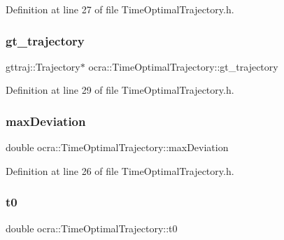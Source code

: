 Definition at line 27 of file Time\+Optimal\+Trajectory.\+h.

\hypertarget{classocra_1_1TimeOptimalTrajectory_a350a0c047e3f65fc7dd55d6b5dfa5796}{}\label{classocra_1_1TimeOptimalTrajectory_a350a0c047e3f65fc7dd55d6b5dfa5796} 
\subsubsection{\texorpdfstring{gt\+\_\+trajectory}{gt\_trajectory}}
{\footnotesize\ttfamily gttraj\+::\+Trajectory$\ast$ ocra\+::\+Time\+Optimal\+Trajectory\+::gt\+\_\+trajectory\hspace{0.3cm}{\ttfamily [protected]}}



Definition at line 29 of file Time\+Optimal\+Trajectory.\+h.

\hypertarget{classocra_1_1TimeOptimalTrajectory_a7709c9a5e8ab5e48657cc965f59d0f57}{}\label{classocra_1_1TimeOptimalTrajectory_a7709c9a5e8ab5e48657cc965f59d0f57} 
\subsubsection{\texorpdfstring{max\+Deviation}{maxDeviation}}
{\footnotesize\ttfamily double ocra\+::\+Time\+Optimal\+Trajectory\+::max\+Deviation\hspace{0.3cm}{\ttfamily [protected]}}



Definition at line 26 of file Time\+Optimal\+Trajectory.\+h.

\hypertarget{classocra_1_1TimeOptimalTrajectory_a7c58d1493c4227bb5d209de36ade154e}{}\label{classocra_1_1TimeOptimalTrajectory_a7c58d1493c4227bb5d209de36ade154e} 
\subsubsection{\texorpdfstring{t0}{t0}}
{\footnotesize\ttfamily double ocra\+::\+Time\+Optimal\+Trajectory\+::t0\hspace{0.3cm}{\ttfamily [protected]}}



